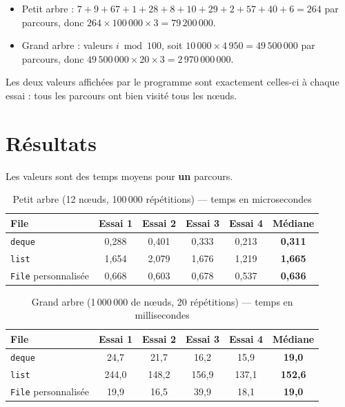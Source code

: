 \documentclass[11pt,a4paper]{article}
\begin{document}
\begin{itemize}
  \item Petit arbre : $7+9+67+1+28+8+10+29+2+57+40+6 = 264$ par parcours, donc
        $264 \times 100\,000 \times 3 = 79\,200\,000$.
  \item Grand arbre : valeurs $i \bmod 100$, soit $10\,000 \times 4\,950 = 49\,500\,000$ par
        parcours, donc $49\,500\,000 \times 20 \times 3 = 2\,970\,000\,000$.
\end{itemize}

\noindent Les deux valeurs affichées par le programme sont exactement celles-ci à chaque essai :
tous les parcours ont bien visité tous les nœuds.

\section{Résultats}

Les valeurs sont des temps moyens pour \textbf{un} parcours.

\begin{table}[H]
\centering
\begin{tabular}{lccccc}
\toprule
\textbf{File} & \textbf{Essai 1} & \textbf{Essai 2} & \textbf{Essai 3} & \textbf{Essai 4} & \textbf{Médiane} \\
\midrule
\texttt{deque}       & 0,288 & 0,401 & 0,333 & 0,213 & \textbf{0,311} \\
\texttt{list}        & 1,654 & 2,079 & 1,676 & 1,219 & \textbf{1,665} \\
\texttt{File} personnalisée &0,668 & 0,603 & 0,678 & 0,537 & \textbf{0,636} \\
\bottomrule
\end{tabular}
\caption{Petit arbre (12 nœuds, 100\,000 répétitions) — temps en microsecondes}
\label{tab:petit}
\end{table}

\begin{table}[H]
\centering
\begin{tabular}{lccccc}
\toprule
\textbf{File} & \textbf{Essai 1} & \textbf{Essai 2} & \textbf{Essai 3} & \textbf{Essai 4} & \textbf{Médiane} \\
\midrule
\texttt{deque}       & 24,7  & 21,7  & 16,2  & 15,9  & \textbf{19,0}  \\
\texttt{list}        & 244,0 & 148,2 & 156,9 & 137,1 & \textbf{152,6} \\
\texttt{File} personnalisée &19,9  & 16,5  & 39,9  & 18,1  & \textbf{19,0}  \\
\bottomrule
\end{tabular}
\caption{Grand arbre (1\,000\,000 de nœuds, 20 répétitions) — temps en millisecondes}
\label{tab:grand}
\end{table}
\end{document}
